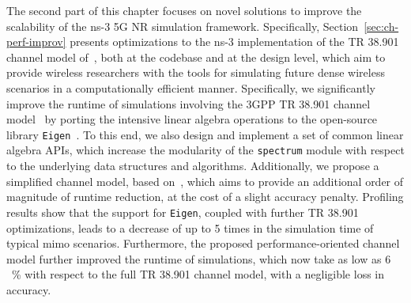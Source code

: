 The second part of this chapter focuses on novel solutions to improve the scalability of the ns-3 5G NR simulation framework. Specifically, Section~\ref{sec:ch-perf-improv} presents optimizations to the ns-3 implementation of the TR 38.901 channel model of~\cite{tommaso:20}, both at the codebase and at the design level, which aim to provide wireless researchers with the tools for simulating future dense wireless scenarios in a computationally efficient manner. Specifically, we significantly improve the runtime of simulations involving the 3GPP TR 38.901 channel model~\cite{TR38901} by porting the intensive linear algebra operations to the open-source library \texttt{Eigen}~\cite{eigenweb}. To this end, we also design and implement a set of common linear algebra APIs, which increase the modularity of the \texttt{spectrum} module with respect to the underlying data structures and algorithms.
Additionally, we propose a simplified channel model, based on~\cite{TR38901}, which aims to provide an additional order of magnitude of runtime reduction, at the cost of a slight accuracy penalty. Profiling results show that the support for \texttt{Eigen}, coupled with further TR 38.901 optimizations, leads to a decrease of up to 5 times in the simulation time of typical \gls{mimo} scenarios. Furthermore, the proposed performance-oriented channel model further improved the runtime of simulations, which now take as low as $6$~\% with respect to the full TR 38.901 channel model, with a negligible loss in accuracy.




